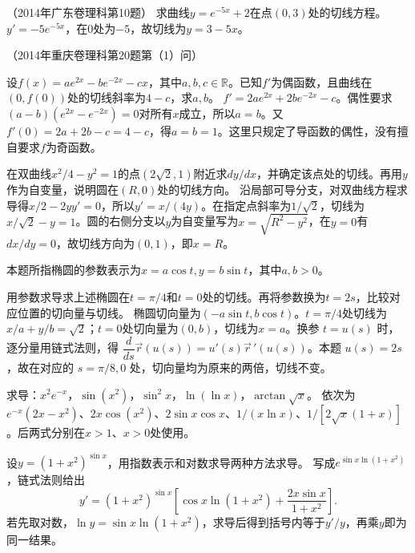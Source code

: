 （2014年广东卷理科第10题）
求曲线\(y=e^{-5x}+2\)在点\((0,3)\)处的切线方程。
\solutionanswer
\(y'=-5e^{-5x}\)，在\(0\)处为\(-5\)，故切线为\(y=3-5x\)。


（2014年重庆卷理科第20题第（1）问）

设\(f(x)=ae^{2x}-be^{-2x}-cx\)，其中\(a,b,c\in\mathbb R\)。已知\(f'\)为偶函数，且曲线在\((0,f(0))\)处的切线斜率为\(4-c\)，求\(a,b\)。
\solutionanswer
\(f'=2ae^{2x}+2be^{-2x}-c\)。偶性要求\((a-b)(e^{2x}-e^{-2x})=0\)对所有\(x\)成立，所以\(a=b\)。又\(f'(0)=2a+2b-c=4-c\)，得\(a=b=1\)。这里只规定了导函数的偶性，没有擅自要求\(f\)为奇函数。


在双曲线\(x^2/4-y^2=1\)的点\((2\sqrt2,1)\)附近求\(dy/dx\)，并确定该点处的切线。再用\(y\)作为自变量，说明圆在\((R,0)\)处的切线方向。
\solutionanswer
沿局部可导分支，对双曲线方程求导得\(x/2-2yy'=0\)，所以\(y'=x/(4y)\)。在指定点斜率为\(1/\sqrt2\)，切线为\(x/\sqrt2-y=1\)。圆的右侧分支以\(y\)为自变量写为\(x=\sqrt{R^2-y^2}\)，在\(y=0\)有\(dx/dy=0\)，故切线方向为\((0,1)\)，即\(x=R\)。


本题所指椭圆的参数表示为\(x=a\cos t,y=b\sin t\)，其中\(a,b>0\)。

用参数求导求上述椭圆在\(t=\pi/4\)和\(t=0\)处的切线。再将参数换为\(t=2s\)，比较对应位置的切向量与切线。
\solutionanswer
椭圆切向量为\((-a\sin t,b\cos t)\)。\(t=\pi/4\)处切线为\(x/a+y/b=\sqrt2\)；\(t=0\)处切向量为\((0,b)\)，切线为\(x=a\)。换参 \(t=u(s)\) 时，逐分量用链式法则，得 \(\dfrac{d}{ds}\vec r(u(s))=u'(s)\vec r\,'(u(s))\)。本题 \(u(s)=2s\)，故在对应的 \(s=\pi/8,0\) 处，切向量均为原来的两倍，切线不变。


求导：\(x^2e^{-x}\)，\(\sin(x^2)\)，\(\sin^2x\)，\(\ln(\ln x)\)，\(\arctan\sqrt x\)。
\solutionanswer
依次为\(e^{-x}(2x-x^2)\)、\(2x\cos(x^2)\)、\(2\sin x\cos x\)、\(1/(x\ln x)\)、\(1/[2\sqrt x(1+x)]\)。后两式分别在\(x>1\)、\(x>0\)处使用。


设\(y=(1+x^2)^{\sin x}\)，用指数表示和对数求导两种方法求导。
\solutionanswer
写成\(e^{\sin x\ln(1+x^2)}\)，链式法则给出
\[
 y'=(1+x^2)^{\sin x}\left[\cos x\ln(1+x^2)+\frac{2x\sin x}{1+x^2}\right].
\]
若先取对数，\(\ln y=\sin x\ln(1+x^2)\)，求导后得到括号内等于\(y'/y\)，再乘\(y\)即为同一结果。


